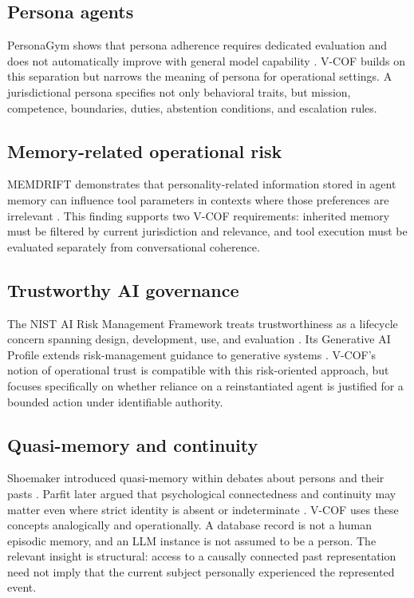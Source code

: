 \documentclass[10pt]{article}
\begin{document}
\subsection{Persona agents}

PersonaGym shows that persona adherence requires dedicated evaluation and does not automatically improve with general model capability \citep{samuel2024personagym}. V-COF builds on this separation but narrows the meaning of persona for operational settings. A jurisdictional persona specifies not only behavioral traits, but mission, competence, boundaries, duties, abstention conditions, and escalation rules.

\subsection{Memory-related operational risk}

MEMDRIFT demonstrates that personality-related information stored in agent memory can influence tool parameters in contexts where those preferences are irrelevant \citep{dabas2026memdrift}. This finding supports two V-COF requirements: inherited memory must be filtered by current jurisdiction and relevance, and tool execution must be evaluated separately from conversational coherence.

\subsection{Trustworthy AI governance}

The NIST AI Risk Management Framework treats trustworthiness as a lifecycle concern spanning design, development, use, and evaluation \citep{nist2023airmf}. Its Generative AI Profile extends risk-management guidance to generative systems \citep{nist2024genai}. V-COF's notion of operational trust is compatible with this risk-oriented approach, but focuses specifically on whether reliance on a reinstantiated agent is justified for a bounded action under identifiable authority.

\subsection{Quasi-memory and continuity}

Shoemaker introduced quasi-memory within debates about persons and their pasts \citep{shoemaker1970persons}. Parfit later argued that psychological connectedness and continuity may matter even where strict identity is absent or indeterminate \citep{parfit1971identity,parfit1984reasons}. V-COF uses these concepts analogically and operationally. A database record is not a human episodic memory, and an LLM instance is not assumed to be a person. The relevant insight is structural: access to a causally connected past representation need not imply that the current subject personally experienced the represented event.
\end{document}
